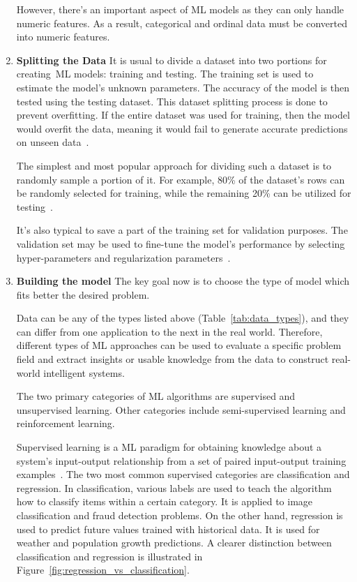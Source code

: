 \begin{enumerate}
    However, there's an important aspect of \gls{ML} models as they can only handle numeric features. As a result, categorical and ordinal data must be converted into numeric features.
    
    
    \item \textbf{Splitting the Data} It is usual to divide a dataset into two portions for creating \gls{ML} models: training and testing. The training set is used to estimate the model's unknown parameters. The accuracy of the model is then tested using the testing dataset. This dataset splitting process is done to prevent overfitting. If the entire dataset was used for training, then the model would overfit the data, meaning it would fail to generate accurate predictions on unseen data~\cite{Joseph2020SPlit:Splitting}.
    
    The simplest and most popular approach for dividing such a dataset is to randomly sample a portion of it. For example, 80\% of the dataset's rows can be randomly selected for training, while the remaining 20\% can be utilized for testing~\cite{Joseph2020SPlit:Splitting}.
    
    It's also typical to save a part of the training set for validation purposes. The validation set may be used to fine-tune the model's performance by selecting hyper-parameters and regularization parameters~\cite{Joseph2020SPlit:Splitting}.
    
    \item \textbf{Building the model} The key goal now is to choose the type of model which fits better the desired problem.
    
    Data can be any of the types listed above (Table~\ref{tab:data_types}), and they can differ from one application to the next in the real world. Therefore, different types of \gls{ML} approaches can be used to evaluate a specific problem field and extract insights or usable knowledge from the data to construct real-world intelligent systems.
    
    The two primary categories of \gls{ML} algorithms are supervised and unsupervised learning. Other categories include semi-supervised learning and reinforcement learning.
    
    Supervised learning is a \gls{ML} paradigm for obtaining knowledge about a system's input-output relationship from a set of paired input-output training examples~\cite{Liu2012SupervisedLearning}. The two most common supervised categories are classification and regression. In classification, various labels are used to teach the algorithm how to classify items within a certain category. It is applied to image classification and fraud detection problems. On the other hand, regression is used to predict future values trained with historical data. It is used for weather and population growth predictions. A clearer distinction between classification and regression is illustrated in Figure~\ref{fig:regression_vs_classification}.
        

\end{enumerate}

